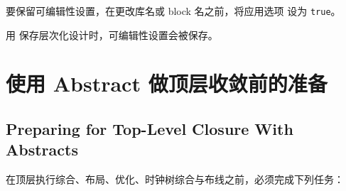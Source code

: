 要保留可编辑性设置，在更改库名或 block 名之前，将应用选项  设为 \texttt{true}。

用  保存层次化设计时，可编辑性设置会被保存。

\section{使用 Abstract 做顶层收敛前的准备}
\subsection*{Preparing for Top-Level Closure With Abstracts}

在顶层执行综合、布局、优化、时钟树综合与布线之前，必须完成下列任务：
